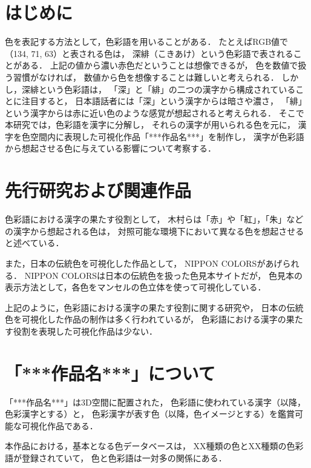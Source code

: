 \documentclass[a4j,twocolumn]{ujarticle} %
\newcommand{\workname}{「***作品名***」}
\newcommand{\colorname}{色彩語}
\newcommand{\colorkanji}{色彩漢字}
\newcommand{\recallcolor}{色イメージ}
\begin{document}
\maketitle
\thispagestyle{myheadings}

\section{はじめに}

色を表記する方法として，\colorname{}を用いることがある．
たとえばRGB値で（134, 71, 63）と表される色は，
深緋（こきあけ）という\colorname{}で表されることがある．
上記の値から濃い赤色だということは想像できるが，
色を数値で扱う習慣がなければ，
数値から色を想像することは難しいと考えられる．
しかし，深緋という\colorname{}は，
「深」と「緋」の二つの漢字から構成されていることに注目すると，
日本語話者には「深」という漢字からは暗さや濃さ，
「緋」という漢字からは赤に近い色のような感覚が想起されると考えられる．
そこで本研究では，\colorname{}を漢字に分解し，
それらの漢字が用いられる色を元に，
漢字を色空間内に表現した可視化作品\workname{}を制作し，
漢字が\colorname{}から想起させる色に与えている影響について考察する．

\section{先行研究および関連作品}

色彩語における漢字の果たす役割として，
木村ら\cite{Kimura1998}は「赤」や「紅」，「朱」などの漢字から想起される色は，
対照可能な環境下において異なる色を想起させると述べている．

また，日本の伝統色を可視化した作品として，
NIPPON COLORS\cite{NipponColors}があげられる．
NIPPON COLORSは日本の伝統色を扱った色見本サイトだが，
色見本の表示方法として，各色をマンセルの色立体を使って可視化している．

上記のように，色彩語における漢字の果たす役割に関する研究や，
日本の伝統色を可視化した作品の制作は多く行われているが，
色彩語における漢字の果たす役割を表現した可視化作品は少ない．

\section{\workname{}について}

\workname{}は3D空間に配置された，
\colorname{}に使われている漢字（以降，\colorkanji{}とする）と，
\colorkanji{}が表す色（以降，\recallcolor{}とする）を鑑賞可能な可視化作品である．

本作品における，基本となる色データベースは，
XX種類の色とXX種類の\colorname{}が登録されていて，
色と\colorname{}は一対多の関係にある．
\end{document}
